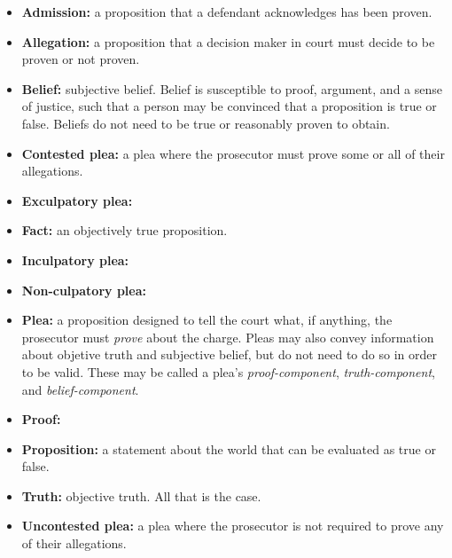 \begin{itemize}
    \item \textbf{Admission:} a proposition that a defendant acknowledges has been proven.
    \item \textbf{Allegation:} a proposition that a decision maker in court must decide to be proven or not proven. 
    \item \textbf{Belief:} subjective belief. Belief is susceptible to proof, argument, and a sense of justice, such that a person may be convinced that a proposition is true or false. Beliefs do not need to be true or reasonably proven to obtain.
    \item \textbf{Contested plea:} a plea where the prosecutor must prove some or all of their allegations.
    \item \textbf{Exculpatory plea:} 
    \item \textbf{Fact:} an objectively true proposition. 
    \item \textbf{Inculpatory plea:}
    \item \textbf{Non-culpatory plea:}
    \item \textbf{Plea:} a proposition designed to tell the court what, if anything, the prosecutor must \textit{prove} about the charge. Pleas may also convey information about objetive truth and subjective belief, but do not need to do so in order to be valid. These may be called a plea's \textit{proof-component}, \textit{truth-component}, and \textit{belief-component}.
    \item \textbf{Proof:}
    \item \textbf{Proposition:} a statement about the world that can be evaluated as true or false.
    \item \textbf{Truth:} objective truth. All that is the case.
    \item \textbf{Uncontested plea:} a plea where the prosecutor is not required to prove any of their allegations.
\end{itemize}